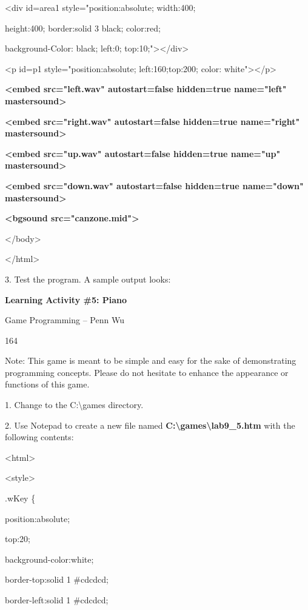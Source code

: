 \documentclass[
]{article}
\begin{document}
\textless div id=area1 style="position:absolute; width:400;

height:400; border:solid 3 black; color:red;

background-Color: black; left:0;
top:10;"\textgreater\textless/div\textgreater{}

\textless p id=p1 style="position:absolute; left:160;top:200; color:
white"\textgreater\textless/p\textgreater{}

\textbf{\textless embed src="left.wav" autostart=false hidden=true
name="left" mastersound\textgreater{}}

\textbf{\textless embed src="right.wav" autostart=false hidden=true
name="right" mastersound\textgreater{}}

\textbf{\textless embed src="up.wav" autostart=false hidden=true
name="up" mastersound\textgreater{}}

\textbf{\textless embed src="down.wav" autostart=false hidden=true
name="down" mastersound\textgreater{}}

\textbf{\textless bgsound src="canzone.mid"\textgreater{}}

\textless/body\textgreater{}

\textless/html\textgreater{}

3. Test the program. A sample output looks:

\textbf{Learning Activity \#5: Piano}

Game Programming -- Penn Wu

164

\protect\hypertarget{index_split_010.htmlux5cux23p165}{}{}Note: This
game is meant to be simple and easy for the sake of demonstrating
programming concepts. Please do not hesitate to enhance the appearance
or functions of this game.

1. Change to the C:\textbackslash games directory.

2. Use Notepad to create a new file named
\textbf{C:\textbackslash games\textbackslash lab9\_5.htm} with the
following contents:

\textless html\textgreater{}

\textless style\textgreater{}

.wKey \{

position:absolute;

top:20;

background-color:white;

border-top:solid 1 \#cdcdcd;

border-left:solid 1 \#cdcdcd;
\end{document}
